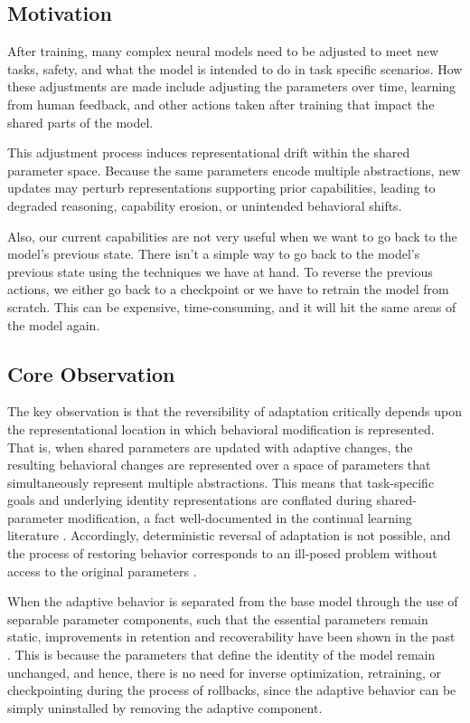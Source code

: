 \documentclass{article}
\begin{document}
	\subsection{Motivation} %
	\label{sec:motivation}
	After training, many complex neural models need to be adjusted to meet new tasks, safety, and what the model is intended to do in task specific scenarios. How these adjustments are made include adjusting the parameters over time, learning from human feedback, and other actions taken after training that impact the shared parts of the model.
	
	This adjustment process induces representational drift within the shared parameter space. Because the same parameters encode multiple abstractions, new updates may perturb representations supporting prior capabilities, leading to degraded reasoning, capability erosion, or unintended behavioral shifts.
	
	Also, our current capabilities are not very useful when we want to go back to the model’s previous state. There isn’t a simple way to go back to the model’s previous state using the techniques we have at hand. To reverse the previous actions, we either go back to a checkpoint or we have to retrain the model from scratch. This can be expensive, time-consuming, and it will hit the same areas of the model again.
	
	\subsection{Core Observation}
	\label{sec:observation}
	
	The key observation is that the reversibility of adaptation critically depends upon the representational location in which behavioral modification is represented. That is, when shared parameters are updated with adaptive changes, the resulting behavioral changes are represented over a space of parameters that simultaneously represent multiple abstractions. This means that task-specific goals and underlying identity representations are conflated during shared-parameter modification, a fact well-documented in the continual learning literature \cite{kirkpatrick2017ewc,delange2021continual}. Accordingly, deterministic reversal of adaptation is not possible, and the process of restoring behavior corresponds to an ill-posed problem without access to the original parameters \cite{kaushik2021rmn}.
	
	When the adaptive behavior is separated from the base model through the use of separable parameter components, such that the essential parameters remain static, improvements in retention and recoverability have been shown in the past \cite{kaushik2021rmn,lanzillotta2023isolation}. This is because the parameters that define the identity of the model remain unchanged, and hence, there is no need for inverse optimization, retraining, or checkpointing during the process of rollbacks, since the adaptive behavior can be simply uninstalled by removing the adaptive component.
	
\end{document}
